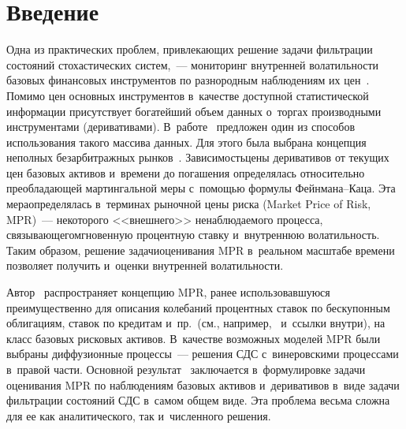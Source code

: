 
  
\vspace*{-2pt}



\thispagestyle{headings}

\begin{multicols}{2}

\label{st\stat}


 \section{Введение}

 Одна из практических проблем, привлекающих  решение задачи фильтрации состояний стохастических систем,~--- 
 мониторинг внутренней волатильности базовых финансовых инструментов по разнородным наблюдениям их цен~\cite{EMT_02, GKL_05, CLR_06}. 
 Помимо цен основных инструментов в~качестве доступной статистической информации присутствует богатейший объем данных 
 о~торгах производными инструментами (деривативами). В~работе~\cite{R_04} предложен один из способов использования такого массива данных.
  Для этого была выбрана концепция неполных безарбитражных рынков~\cite{B_98, D_01}. Зависимость\linebreak цены деривативов от текущих цен базовых активов 
  и~времени до погашения определялась относительно преобладающей мартингальной меры с~по\-мощью формулы Фейн\-ма\-на--Ка\-ца. 
  Эта мера\linebreak \mbox{определялась} в~терминах рыночной цены риска (Market Price of Risk, MPR)~--- некоторого <<внеш\-не\-го>> ненаблюдаемого процесса, 
  связывающего\linebreak мгновенную процентную ставку и~внутреннюю волатильность. Таким образом, решение задачи\linebreak оценивания MPR в~реальном масштабе 
  времени поз\-во\-ля\-ет получить и~оценки внутренней во\-ла\-тиль\-ности.
  { %
  
  }

 Автор~\cite{R_04} распространяет концепцию MPR, ранее использовавшуюся преимущественно для описания колебаний процентных ставок 
 по бескупонным облигациям, ставок по кредитам и~пр.\ (см., например,~\cite{DS_00} и~ссылки внутри), на класс базовых рисковых активов. 
 В~качестве возможных моделей MPR были выбраны диффузионные процессы~--- решения СДС с~винеровскими процессами в~правой 
 части. Основной результат~\cite{R_04} заключается в~формулировке задачи оценивания MPR по наблюдениям базовых активов и~деривативов в~виде 
 задачи фильт\-ра\-ции состояний СДС в~самом общем виде. Эта проб\-ле\-ма весьма сложна для ее как аналитического, так и~численного решения.


\end{multicols}
